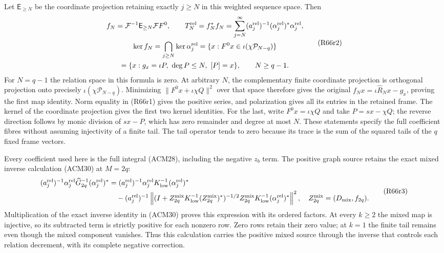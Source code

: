 Let $\mathsf E_{\geq N}$ be the coordinate projection retaining
exactly $j\geq N$ in this weighted sequence space. Then
\[
\begin{gathered}
 f_N=\mathcal F^{-1}\mathsf E_{\geq N}\mathcal F F^0,
 \qquad
 T_N^{\rm rel}=f_N^*f_N
       =\sum_{j=N}^{\infty}(a_j^{\rm rel})^{-1}
                    (\alpha_j^{\rm rel})^*\alpha_j^{\rm rel},\\
 \ker f_N=\bigcap_{j\geq N}\ker\alpha_j^{\rm rel}
 =\{x:F^0x\in\iota(\chi\mathcal P_{N-q})\}\\
 =\{x:g_x=\iota P,\ \deg P\leq N,\ [P]=x\},
 \qquad N\geq q-1.
\end{gathered}\tag{R66r2}
\]
For $N=q-1$ the relation space in this formula is zero.
At arbitrary $N$, the complementary finite coordinate projection
is orthogonal projection onto precisely
$\iota(\chi\mathcal P_{N-q})$. Minimizing
$\|F^0x+\iota\chi Q\|^2$ over that space therefore gives
the original $f_Nx=\iota\widehat R_Nx-g_x$, proving the first
map identity. Norm equality in (R66r1) gives the positive series,
and polarization gives all its entries in the retained frame.
The kernel of the coordinate projection gives the first two
kernel identities. For the last, write
$F^0x=\iota\chi Q$ and take $P=sx-\chi Q$; the reverse
direction follows by monic division of $sx-P$, which has zero
remainder and degree at most $N$. These statements specify the
full coefficient fibres without assuming injectivity of a
finite tail. The tail operator tends to zero because its trace
is the sum of the squared tails of the $q$ fixed frame vectors.

Every coefficient used here is the full integral (ACM28),
including the negative $z_b$ term. The positive graph source
retains the exact mixed inverse calculation (ACM30) at $M=2q$:
\[
\begin{aligned}
 (a_j^{\rm rel})^{-1}\alpha_j^{\rm rel}
                \widehat G_{2q}^{-1}(\alpha_j^{\rm rel})^*
 &=(a_j^{\rm rel})^{-1}\alpha_j^{\rm rel}
                    K_{\rm low}^{-1}(\alpha_j^{\rm rel})^*\\
 &\quad-(a_j^{\rm rel})^{-1}\left\|
 (I+Z_{2q}^{\rm mix}K_{\rm low}^{-1}(Z_{2q}^{\rm mix})^*)^{-1/2}
 Z_{2q}^{\rm mix}K_{\rm low}^{-1}(\alpha_j^{\rm rel})^*
                                    \right\|^2,
 \quad Z_{2q}^{\rm mix}=(D_{\rm mix},f_{2q}).
\end{aligned}\tag{R66r3}
\]
Multiplication of the exact inverse identity in (ACM30) proves
this expression with its ordered factors. At every $k\geq2$
the mixed map is injective, so its subtracted term is strictly
positive for each nonzero row. Zero rows retain their zero
value; at $k=1$ the finite tail remains even though the mixed
component vanishes. Thus this calculation carries the positive
mixed source through the inverse that controls each relation
decrement, with its complete negative correction.

